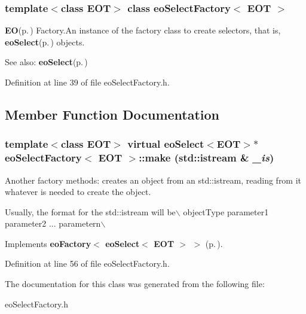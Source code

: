 \subsubsection*{template$<$class EOT$>$ class eo\-Select\-Factory$<$ EOT $>$}

{\bf EO}{\rm (p.\,\pageref{class_e_o})} Factory.An instance of the factory class to create selectors, that is, {\bf eo\-Select}{\rm (p.\,\pageref{classeo_select})} objects. 

\begin{Desc}
\item[See also:]{\bf eo\-Select}{\rm (p.\,\pageref{classeo_select})} \end{Desc}




Definition at line 39 of file eo\-Select\-Factory.h.

\subsection{Member Function Documentation}
\subsubsection{\setlength{\rightskip}{0pt plus 5cm}template$<$class EOT$>$ virtual {\bf eo\-Select}$<${\bf EOT}$>$$\ast$ {\bf eo\-Select\-Factory}$<$ {\bf EOT} $>$::make (std::istream \& {\em \_\-is})\hspace{0.3cm}{\tt  [inline, virtual]}}\label{classeo_select_factory_a0}


Another factory methods: creates an object from an std::istream, reading from it whatever is needed to create the object. 

Usually, the format for the std::istream will be$\backslash$ object\-Type parameter1 parameter2 ... parametern$\backslash$

Implements {\bf eo\-Factory$<$ eo\-Select$<$ EOT $>$ $>$} {\rm (p.\,\pageref{classeo_factory_a0})}.

Definition at line 56 of file eo\-Select\-Factory.h.

The documentation for this class was generated from the following file:\begin{CompactItemize}
\item 
eo\-Select\-Factory.h\end{CompactItemize}
